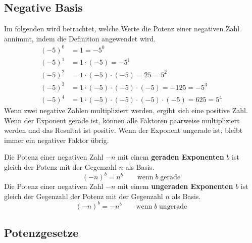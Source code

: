 \newpage
\subsection{Negative Basis}

Im folgenden wird betrachtet, welche Werte die Potenz einer negativen Zahl annimmt, indem die Definition angewendet wird.
\begin{align*}
  (-5)^{0} &= 1 = -5^{0} \\
  (-5)^{1} &= 1\cdot(-5) = -5^{1} \\
  (-5)^{2} &= 1\cdot(-5)\cdot(-5) = 25 = 5^{2} \\
  (-5)^{3} &= 1\cdot(-5)\cdot(-5)\cdot(-5) = -125 = -5^{3} \\
  (-5)^{4} &= 1\cdot(-5)\cdot(-5)\cdot(-5)\cdot(-5) = 625 = 5^{4}
\end{align*}
Wenn zwei negative Zahlen multipliziert werden, ergibt sich eine positive Zahl. Wenn der Exponent gerade ist, können alle Faktoren paarweise multipliziert werden und das Resultat ist positiv. Wenn der Exponent ungerade ist, bleibt immer ein negativer Faktor übrig.
\begin{theorem}
  Die Potenz einer negativen Zahl $-n$ mit einem \textbf{geraden Exponenten} $b$ ist gleich der Potenz mit der Gegenzahl $n$ als Basis.
  \[
    (-n)^{b} = n^{b} \qquad \text{wenn}\;b\;\text{gerade}
  \]
  Die Potenz einer negativen Zahl $-n$ mit einem \textbf{ungeraden Exponenten} $b$ ist gleich der Gegenzahl der Potenz mit der Gegenzahl $n$ als Basis.
  \[
    (-n)^{b} = -n^{b} \qquad \text{wenn}\;b\;\text{ungerade}
  \]
\end{theorem}

\subsection{Potenzgesetze}

